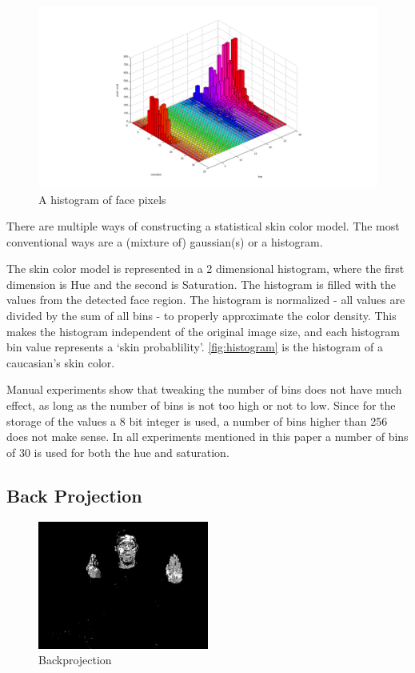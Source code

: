 \begin{figure}[tb]
    \center{}
    \includegraphics[width=1\textwidth]{figures/pipeline/histogram.png}
	\caption{A histogram of face pixels}
	\label{fig:histogram}
\end{figure}

There are multiple ways of constructing a statistical skin color model. The most conventional ways are a (mixture of) gaussian(s) or a histogram. 

The skin color model is represented in a 2 dimensional histogram, where the first dimension is Hue and the second is Saturation. The histogram is filled with the values from the detected face region. The histogram is normalized - all values are divided by the sum of all bins - to properly approximate the color density. This makes the histogram independent of the original image size, and each histogram bin value represents a `skin probablility'. \autoref{fig:histogram} is the histogram of a caucasian's skin color.

Manual experiments show that tweaking the number of bins does not have much effect, as long as the number of bins is not too high or not to low. Since for the storage of the values a 8 bit integer is used, a number of bins higher than 256 does not make sense. In all experiments mentioned in this paper a number of bins of 30 is used for both the hue and saturation.

\subsection*{Back Projection}

\begin{figure}[tb]
    \center{}
    \includegraphics[width=0.5\textwidth]{figures/pipeline/backproject.jpg}
 	\caption{Backprojection}
	\label{fig:backproject}
\end{figure}


